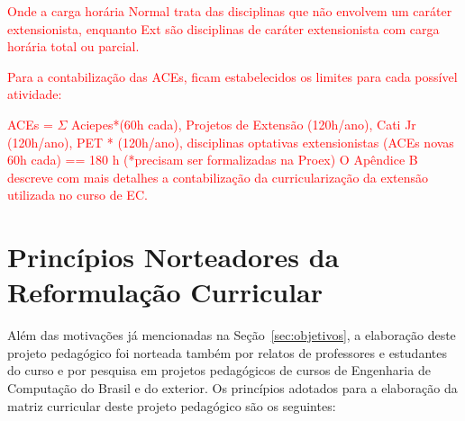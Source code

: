  


\textcolor{red}{Onde a carga horária Normal trata das disciplinas que não envolvem um caráter extensionista, enquanto Ext são disciplinas de caráter extensionista com carga horária total ou parcial.}

\textcolor{red}{Para a contabilização das ACEs, ficam estabelecidos os limites para cada possível atividade:}

\textcolor{red}{ACEs = $\Sigma $ Aciepes*(60h cada), Projetos de Extensão (120h/ano), Cati Jr (120h/ano), PET%
* (120h/ano), disciplinas optativas extensionistas (ACEs novas 60h cada) == 180 h  (*precisam ser formalizadas na Proex)
}
\textcolor{red}{O Apêndice B descreve com mais detalhes a contabilização da curricularização da extensão utilizada no curso de EC.}

\section{Princípios Norteadores da Reformulação Curricular}

Além das motivações já mencionadas na Seção~\ref{sec:objetivos}, a elaboração deste projeto pedagógico foi norteada também por relatos de professores e estudantes do curso e por pesquisa em projetos pedagógicos de cursos de Engenharia de Computação do Brasil e do exterior. Os princípios adotados para a elaboração da matriz curricular deste projeto pedagógico são os seguintes:

